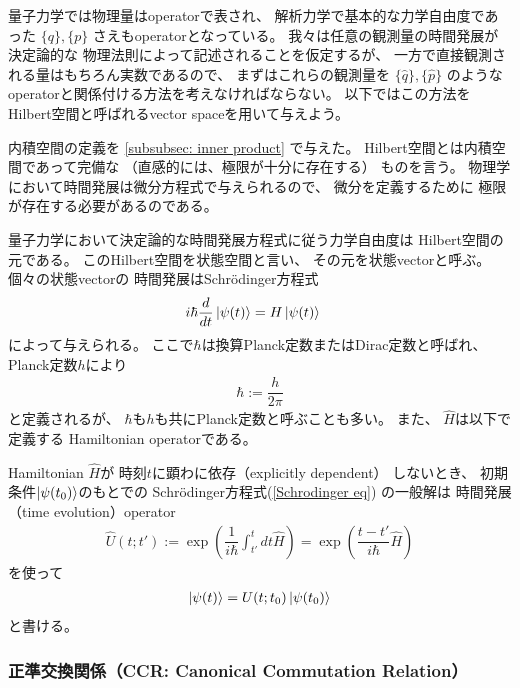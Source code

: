 量子力学では物理量はoperatorで表され、
解析力学で基本的な力学自由度であった
$\{q\},\{p\}$
さえもoperatorとなっている。
我々は任意の観測量の時間発展が決定論的な
物理法則によって記述されることを仮定するが、
一方で直接観測される量はもちろん実数であるので、
まずはこれらの観測量を
$\{\hat{q}\},\{\hat{p}\}$
のようなoperatorと関係付ける方法を考えなければならない。
以下ではこの方法を
Hilbert空間と呼ばれるvector spaceを用いて与えよう。

内積空間の定義を
\ref{subsubsec: inner product}
で与えた。
Hilbert空間とは内積空間であって完備な
（直感的には、極限が十分に存在する）
ものを言う。
物理学において時間発展は微分方程式で与えられるので、
微分を定義するために
極限が存在する必要があるのである。

量子力学において決定論的な時間発展方程式に従う力学自由度は
Hilbert空間の元である。
このHilbert空間を状態空間と言い、
その元を状態vectorと呼ぶ。
個々の状態vectorの
時間発展はSchr\"odinger方程式
\begin{align}
    i\hbar \dfrac{d}{dt}
        \ket{\psi(t)}
    &=
    H \ket{\psi(t)}
\label{Schrodinger eq}
\end{align}
によって与えられる。
ここで$\hbar$は換算Planck定数またはDirac定数と呼ばれ、
Planck定数$h$により
\begin{align}
    \hbar := \dfrac{h}{2\pi}
\end{align}
と定義されるが、
$\hbar$も$h$も共にPlanck定数と呼ぶことも多い。
また、
$\hat{H}$は以下で定義する
Hamiltonian operatorである。

Hamiltonian $\hat{H}$が
時刻$t$に顕わに依存（explicitly dependent）
しないとき、
初期条件$\ket{ \psi(t_0) }$のもとでの
Schr\"odinger方程式(\ref{Schrodinger eq})
の一般解は
時間発展（time evolution）operator
\begin{align}
    \hat{U}(t;t')
    :=
    \exp\left(
        \dfrac{1}{i \hbar}
        \int_{t'}^{t}dt
        \hat{H}
    \right)
    =
    \exp\left(
        \dfrac{t - t'}{i \hbar}
        \hat{H}
    \right)
\label{time evolution operator}
\end{align}
を使って
\begin{align}
    \ket{ \psi(t) }
    =
    U (t;t_0)
    \ket{ \psi(t_0) }
\label{time dependent solution for Schrodinger eq}
\end{align}
と書ける。

\subsubsection{正準交換関係（CCR: Canonical Commutation Relation）}
\label{subsubsec: CCR}


